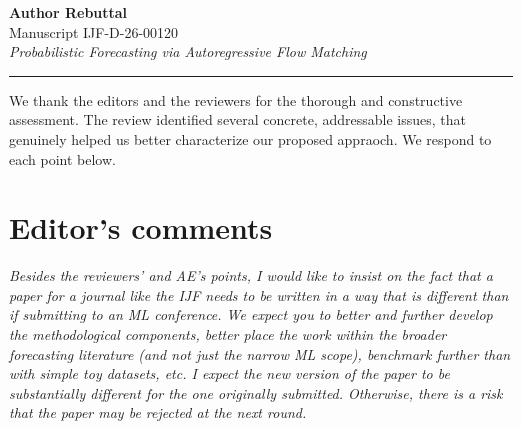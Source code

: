 \documentclass[11pt]{article}
\newcommand{\reviewertext}[1]{%
  \begin{reviewerquote}
    {\color{reviewercolor}\itshape #1}
  \end{reviewerquote}%
}
\begin{document}
\begin{center}
  {\LARGE \textbf{Author Rebuttal}}\\[6pt]
  {\large Manuscript IJF-D-26-00120}\\[4pt]
  {\large \textit{Probabilistic Forecasting via Autoregressive Flow Matching}}\\[4pt]
  \rule{\linewidth}{0.4pt}
\end{center}

\vspace{4pt}

We thank the editors and the reviewers for the thorough and constructive assessment. The review identified several concrete, addressable issues, that genuinely helped us better characterize our proposed appraoch. We respond to each point below. 

\vspace{8pt}


\section{Editor's comments}

\reviewertext{%
Besides the reviewers' and AE's points, I would like to insist on the fact that a paper for a journal like the IJF needs to be written in a way that is different than if submitting to an ML conference. We expect you to better and further develop the methodological components, better place the work within the broader forecasting literature (and not just the narrow ML scope), benchmark further than with simple toy datasets, etc. I expect the new version of the paper to be substantially different for the one originally submitted. Otherwise, there is a risk that the paper may be rejected at the next round.
}
\end{document}

